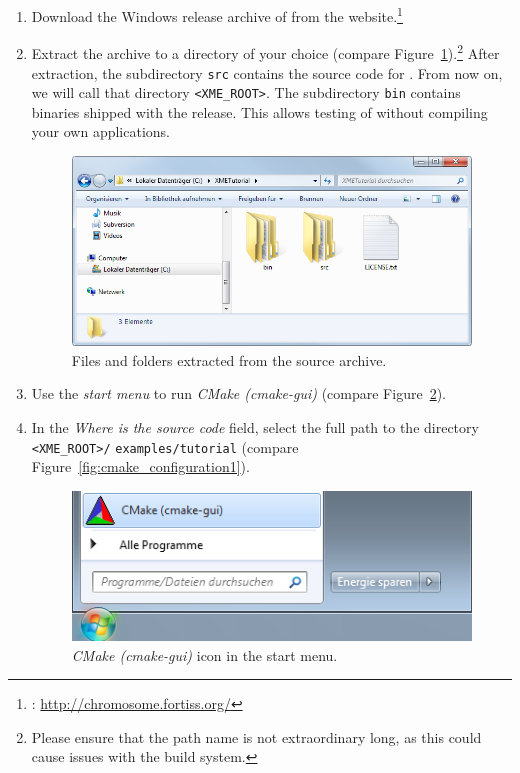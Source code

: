 \begin{enumerate}
	\item Download the Windows release archive of \xme from the website.\footnote{\xme: \url{http://chromosome.fortiss.org/}}
	\item Extract the archive to a directory of your choice (compare Figure~\ref{fig:xme_extracted}).\footnote{%
		Please ensure that the path name is not extraordinary long, as this could cause issues with the build system.}
		After extraction, the subdirectory \verb|src| contains the source code for \xme.
		From now on, we will call that directory \verb|<XME_ROOT>|.
		The subdirectory \verb|bin| contains binaries shipped with the release.
		This allows testing of \xme without compiling your own applications.

\begin{figure}[htpb]
	\centering
	\includegraphics[scale=0.75]{figures/PNG/extracted2.png}
	\caption{Files and folders extracted from the source archive.}
	\label{fig:xme_extracted}
\end{figure}

	\item Use the \emph{start menu} to run \emph{CMake (cmake-gui)} (compare Figure~\ref{fig:cmake_run}).
	\item In the \emph{Where is the source code} field, select the full path to the directory
		\verb|<XME_ROOT>/| \verb|examples/tutorial| (compare Figure~\ref{fig:cmake_configuration1}).

\begin{figure}[htpb]
	\centering
	\includegraphics[scale=0.75]{figures/PNG/cmake_run.png}
	\caption{\emph{CMake (cmake-gui)} icon in the start menu.}
	\label{fig:cmake_run}
\end{figure}


\end{enumerate}
